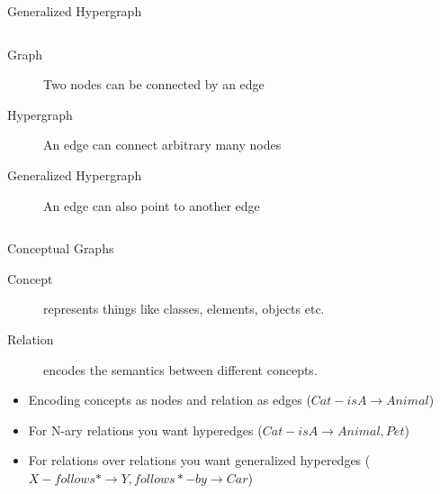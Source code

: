\documentclass[pdf]
{beamer}
\begin{document}

\begin{frame}{Generalized Hypergraph}
	\begin{columns}
		\begin{column}{.5\textwidth}
			\begin{description}
			\item[Graph] Two nodes can be connected by an edge
			\item[Hypergraph] An edge can connect arbitrary many nodes
			\item[Generalized Hypergraph] An edge can also point to another edge
			\end{description}
		\end{column}
		\begin{column}{.5\textwidth}
			
		\end{column}
	\end{columns}
\end{frame}

\begin{frame}{Conceptual Graphs}
    \begin{description}
        \item[Concept] represents things like classes, elements, objects etc.
        \item[Relation] encodes the semantics between different concepts.
    \end{description}
    \begin{itemize}
        \item Encoding concepts as nodes and relation as edges ($Cat - isA \to Animal$)
        \item For N-ary relations you want hyperedges ($Cat - isA \to Animal, Pet$)
        \item For relations over relations you want generalized hyperedges ($X - follows* \to Y, follows* - by \to Car$) 
    \end{itemize}
\end{frame}
\end{document}
